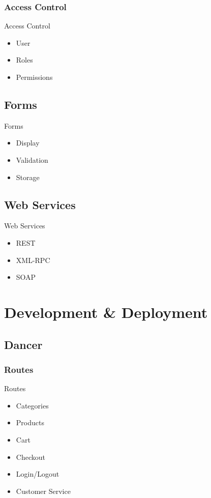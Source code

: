 \subsubsection{Access Control}
\begin{frame}{Access Control}
\begin{itemize}
\item User
\item Roles
\item Permissions
\end{itemize}
\end{frame}

\subsection{Forms}
\begin{frame}{Forms}
\begin{itemize}
\item Display
\item Validation
\item Storage
\end{itemize}
\end{frame}

\subsection{Web Services}
\begin{frame}{Web Services}
\begin{itemize}
\item REST
\item XML-RPC
\item SOAP
\end{itemize}
\end{frame}

\section{Development \& Deployment}
\subsection{Dancer}
\subsubsection{Routes}
\begin{frame}{Routes}
\begin{itemize}
\item Categories
\item Products
\item Cart
\item Checkout
\item Login/Logout
\item Customer Service
\end{itemize}
\end{frame}

